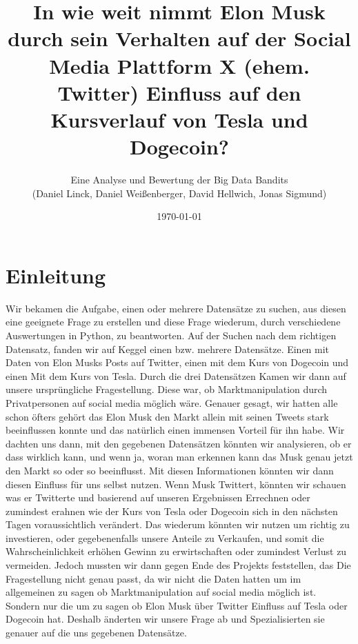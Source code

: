 \documentclass{article}
\title{\textbf {In wie weit nimmt Elon Musk durch sein Verhalten auf der Social Media Plattform X (ehem. Twitter) Einfluss auf den Kursverlauf von Tesla und Dogecoin?}}
\author{Eine Analyse und Bewertung der Big Data Bandits \\ (Daniel Linck, Daniel Weißenberger, David Hellwich, Jonas Sigmund)}
\date{\today}
\begin{document}
\maketitle

\tableofcontents

\section{Einleitung}
Wir bekamen die Aufgabe, einen oder mehrere Datensätze zu suchen, aus diesen eine geeignete Frage zu erstellen und diese Frage wiederum, durch verschiedene Auswertungen in Python, zu beantworten. Auf der Suchen nach dem richtigen Datensatz, fanden wir auf Keggel einen bzw. mehrere Datensätze. Einen mit Daten von Elon Musks Posts auf Twitter, einen mit dem Kurs von Dogecoin und einen Mit dem Kurs von Tesla. Durch die drei Datensätzen Kamen wir dann auf unsere ursprüngliche Fragestellung. Diese war, ob Marktmanipulation durch Privatpersonen auf social media möglich wäre. Genauer gesagt, wir hatten alle schon öfters gehört das Elon Musk den Markt allein mit seinen Tweets stark beeinflussen konnte und das natürlich einen immensen Vorteil für ihn habe. Wir dachten uns dann, mit den gegebenen Datensätzen könnten wir analysieren, ob er dass wirklich kann, und wenn ja, woran man erkennen kann das Musk genau jetzt den Markt so oder so beeinflusst. Mit diesen Informationen könnten wir dann diesen Einfluss für uns selbst nutzen. Wenn Musk Twittert, könnten wir schauen was er Twitterte und basierend auf unseren Ergebnissen Errechnen oder zumindest erahnen wie der Kurs von Tesla oder Dogecoin sich in den nächsten Tagen voraussichtlich verändert. Das wiederum könnten wir nutzen um richtig zu investieren, oder gegebenenfalls unsere Anteile zu Verkaufen, und somit die Wahrscheinlichkeit erhöhen Gewinn zu erwirtschaften oder zumindest Verlust zu vermeiden. Jedoch mussten wir dann gegen Ende des Projekts feststellen, das Die Fragestellung nicht genau passt, da wir nicht die Daten hatten um im allgemeinen zu sagen ob Marktmanipulation auf social media möglich ist. Sondern nur die um zu sagen ob Elon Musk über Twitter Einfluss auf Tesla oder Dogecoin hat. Deshalb änderten wir unsere Frage ab und Spezialisierten sie genauer auf die uns gegebenen Datensätze.

\newpage
\end{document}
